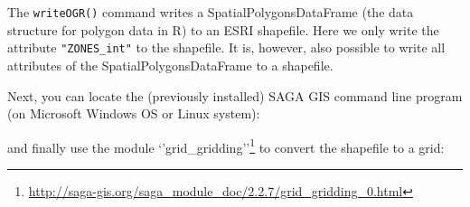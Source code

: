\documentclass[11pt]{krantz}
\newenvironment{Shaded}{\begin{snugshade}}{\end{snugshade}}
\newcommand{\CommentTok}[1]{\textcolor[rgb]{0.37,0.37,0.37}{\textit{#1}}}
\newcommand{\ControlFlowTok}[1]{\textcolor[rgb]{0.27,0.27,0.27}{\textbf{#1}}}
\newcommand{\KeywordTok}[1]{\textcolor[rgb]{0.27,0.27,0.27}{\textbf{#1}}}
\newcommand{\NormalTok}[1]{#1}
\newcommand{\OperatorTok}[1]{\textcolor[rgb]{0.43,0.43,0.43}{\textbf{#1}}}
\newcommand{\StringTok}[1]{\textcolor[rgb]{0.5,0.5,0.5}{#1}}
\renewcommand{\href}[2]{#2\footnote{\url{#1}}}
\theoremstyle{definition}
\theoremstyle{definition}
\theoremstyle{definition}
\theoremstyle{remark}
\begin{document}
\begin{Shaded}
\end{Shaded}

The \texttt{writeOGR()} command writes a SpatialPolygonsDataFrame (the
data structure for polygon data in R) to an ESRI shapefile. Here we only
write the attribute \texttt{"ZONES\_int"} to the shapefile. It is,
however, also possible to write all attributes of the
SpatialPolygonsDataFrame to a shapefile.

Next, you can locate the (previously installed) SAGA GIS command line
program (on Microsoft Windows OS or Linux system):

\begin{Shaded}
\end{Shaded}

and finally use the module
\href{http://saga-gis.org/saga_module_doc/2.2.7/grid_gridding_0.html}{`'grid\_gridding''}
to convert the shapefile to a grid:
\end{document}
